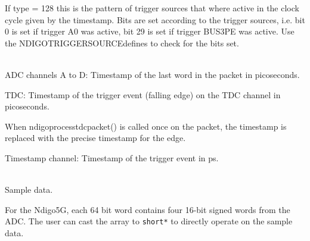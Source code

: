     If type = 128 this is the pattern of trigger sources that where active in the clock cycle given by the timestamp. Bits are set according to the trigger sources, i.e. bit 0 is set if trigger A0 was active, bit 29 is set if trigger BUS3\tu PE was active. Use the \textsf{NDIGO\tu TRIGGER\tu SOURCE\tu *defines}{} to check for the bits set.\par

    \\
    ADC channels A to D: Timestamp of the last word in the packet in picoseconds.\par

    TDC: Timestamp of the trigger event (falling edge) on the TDC channel in picoseconds.\par

    When \textsf{ndigo\tu process\tu tdc\tu packet()} is called once on the packet, the timestamp is replaced with the precise timestamp for the edge.\par

    Timestamp channel: Timestamp of the trigger event in ps.\par

    \\
    Sample data.\par
    For the Ndigo5G, each 64 bit word contains four 16-bit signed words from the ADC. The user can cast the array to \texttt{short*} to directly operate on the sample data.